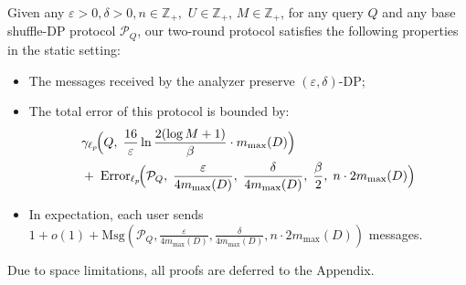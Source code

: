 \begin{theorem}
\label{the: static two-round}   
    Given any $\varepsilon > 0, \delta >0, n \in \mathbb{Z}_+, $ $U \in \mathbb{Z}_{+}$, $M \in \mathbb{Z}_{+}$, for any query $Q$ and any base shuffle-DP protocol $\mathcal{P}_Q$, our two-round protocol satisfies the following properties in the static setting:

    \begin{itemize}
    \item The messages received by the analyzer preserve $(\varepsilon,\delta)$-DP;
    \item The total error of this protocol is bounded by:
    \[
    \begin{aligned}
    &\mathrm{\gamma}_{\ell_p}\!\Big(
        Q,\;
        \frac{16}{\varepsilon}\ln\frac{2(\log M +1)}{\beta} \cdot m_{\max}(D)
    \Big)
    \\
    &+\;
    \mathrm{Error}_{\ell_p}\!\Big(
        \mathcal{P}_Q,\;
        \frac{\varepsilon}{4m_{\max}(D)},\;
        \frac{\delta}{4m_{\max}(D)},\;
        \frac{\beta}{2},\;
        n\cdot 2m_{\max}(D)
    \Big)
    \end{aligned}
    \]



    \item In expectation, each user sends $1+ o(1)+\mathrm{Msg}(\mathcal{P}_Q, \allowbreak \frac{\varepsilon}{4m_{\max}(D)}, \allowbreak \frac{\delta}{4m_{\max}(D)}, \allowbreak n\cdot 2m_{\max}(D))$ messages.

\end{itemize}

\end{theorem}


Due to space limitations, all proofs are deferred to the Appendix.


